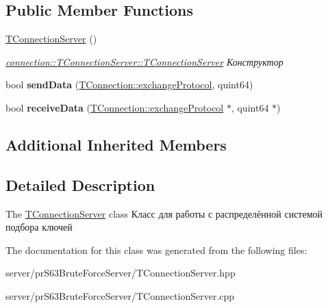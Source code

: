\subsection*{Public Member Functions}
\begin{DoxyCompactItemize}
\item 
\mbox{\label{classconnection_1_1_t_connection_server_a823a7c07aaea7a3ab3ea1a854a1cd3a0}} 
\hyperlink{classconnection_1_1_t_connection_server_a823a7c07aaea7a3ab3ea1a854a1cd3a0}{T\+Connection\+Server} ()
\begin{DoxyCompactList}\small\item\em \hyperlink{classconnection_1_1_t_connection_server_a823a7c07aaea7a3ab3ea1a854a1cd3a0}{connection\+::\+T\+Connection\+Server\+::\+T\+Connection\+Server} Конструктор \end{DoxyCompactList}\item 
\mbox{\label{classconnection_1_1_t_connection_server_a481b658bc12f7bb0b5fee3ccef2937ff}} 
bool {\bfseries send\+Data} (\hyperlink{classconnection_1_1_t_connection_a3550181cb2fa72eccfa55d23f45cea34}{T\+Connection\+::exchange\+Protocol}, quint64)
\item 
\mbox{\label{classconnection_1_1_t_connection_server_a40b7cdfa826bf501fdb165e965511736}} 
bool {\bfseries receive\+Data} (\hyperlink{classconnection_1_1_t_connection_a3550181cb2fa72eccfa55d23f45cea34}{T\+Connection\+::exchange\+Protocol} $\ast$, quint64 $\ast$)
\end{DoxyCompactItemize}
\subsection*{Additional Inherited Members}


\subsection{Detailed Description}
The \hyperlink{classconnection_1_1_t_connection_server}{T\+Connection\+Server} class Класс для работы с распределённой системой подбора ключей 

The documentation for this class was generated from the following files\+:\begin{DoxyCompactItemize}
\item 
server/pr\+S63\+Brute\+Force\+Server/T\+Connection\+Server.\+hpp\item 
server/pr\+S63\+Brute\+Force\+Server/T\+Connection\+Server.\+cpp\end{DoxyCompactItemize}
